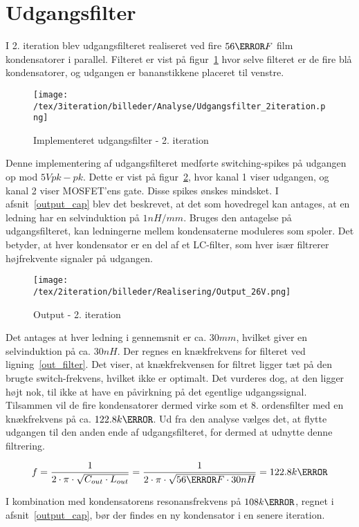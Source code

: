 
\section{Udgangsfilter}
I 2. iteration blev udgangsfilteret realiseret ved fire $56\micro F$ film kondensatorer i parallel. Filteret er vist på figur~\ref{fig:udgangsfilter_2} hvor selve filteret er de fire blå kondensatorer, og udgangen er bananstikkene placeret til venstre. 


\begin{figure}[H]
	\center
	\texttt{[image: /tex/3iteration/billeder/Analyse/Udgangsfilter\_2iteration.png]}
	\caption{Implementeret udgangsfilter - 2. iteration}
	\label{fig:udgangsfilter_2}
\end{figure}

\noindent Denne implementering af udgangsfilteret medførte switching-spikes på udgangen op mod $5V pk-pk$. Dette er vist på figur~\ref{fig:output_2}, hvor kanal 1 viser udgangen, og kanal 2 viser MOSFET'ens gate. Disse spikes ønskes mindsket. I afsnit~\ref{output_cap} blev det beskrevet, at det som hovedregel kan antages, at en ledning har en selvinduktion på $1nH/mm$. Bruges den antagelse på udgangsfilteret, kan ledningerne mellem kondensaterne moduleres som spoler. Det betyder, at hver kondensator er en del af et LC-filter, som hver især filtrerer højfrekvente signaler på udgangen. 


\begin{figure}[H]
	\center
	\texttt{[image: /tex/2iteration/billeder/Realisering/Output\_26V.png]}
	\caption{Output - 2. iteration}
	\label{fig:output_2}
\end{figure}

\noindent Det antages at hver ledning i gennemsnit er ca. $30mm$, hvilket giver en selvinduktion på ca. $30nH$. Der regnes en knækfrekvens for filteret ved ligning~\ref{out_filter}. Det viser, at knækfrekvensen for filtret ligger tæt på den brugte switch-frekvens, hvilket ikke er optimalt. Det vurderes dog, at den ligger højt nok, til ikke at have en påvirkning på det egentlige udgangssignal. Tilsammen vil de fire kondensatorer dermed virke som et 8. ordensfilter med en knækfrekvens på ca. $122.8k\hertz$. Ud fra den analyse vælges det, at flytte udgangen til den anden ende af udgangsfilteret, for dermed at udnytte denne filtrering. 

\begin{equation} \label{out_filter}
f = \frac{1}{2 \cdot \pi \cdot \sqrt{C_{out} \cdot L_{out}}} = \frac{1}{2 \cdot \pi \cdot \sqrt{56\micro F \cdot 30nH}} = 122.8k\hertz
\end{equation}

\noindent I kombination med kondensatorens resonansfrekvens på $108k\hertz$, regnet i afsnit~\ref{output_cap}, bør der findes en ny kondensator i en senere iteration. 

